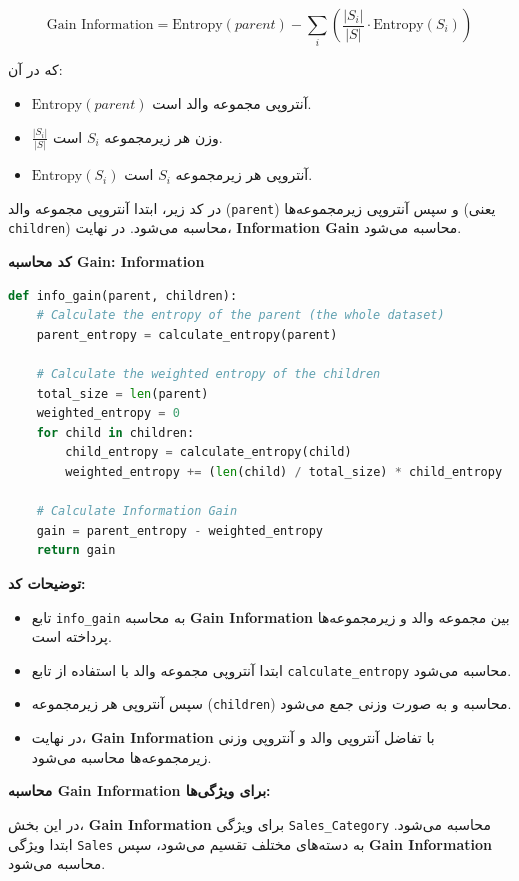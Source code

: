 \documentclass{article}
\begin{document}
\[
\text{Gain Information} = \text{Entropy}(parent) - \sum_{i} \left( \frac{|S_i|}{|S|} \cdot \text{Entropy}(S_i) \right)
\]

که در آن:
\begin{itemize}
    \item \( \text{Entropy}(parent) \) آنتروپی مجموعه والد است.
    \item \( \frac{|S_i|}{|S|} \) وزن هر زیرمجموعه \( S_i \) است.
    \item \( \text{Entropy}(S_i) \) آنتروپی هر زیرمجموعه \( S_i \) است.
\end{itemize}

در کد زیر، ابتدا آنتروپی مجموعه والد (\texttt{parent}) و سپس آنتروپی زیرمجموعه‌ها (یعنی \texttt{children}) محاسبه می‌شود. در نهایت، \textbf{Information Gain} محاسبه می‌شود.

\textbf{کد محاسبه Gain: Information}

\begin{lstlisting}[language=Python]
def info_gain(parent, children):
    # Calculate the entropy of the parent (the whole dataset)
    parent_entropy = calculate_entropy(parent)

    # Calculate the weighted entropy of the children
    total_size = len(parent)
    weighted_entropy = 0
    for child in children:
        child_entropy = calculate_entropy(child)
        weighted_entropy += (len(child) / total_size) * child_entropy

    # Calculate Information Gain
    gain = parent_entropy - weighted_entropy
    return gain
\end{lstlisting}

\textbf{توضیحات کد:}

\begin{itemize}
    \item تابع \texttt{info\_gain} به محاسبه \textbf{Gain Information} بین مجموعه والد و زیرمجموعه‌ها پرداخته است.
    \item ابتدا آنتروپی مجموعه والد با استفاده از تابع \texttt{calculate\_entropy} محاسبه می‌شود.
    \item سپس آنتروپی هر زیرمجموعه (\texttt{children}) محاسبه و به صورت وزنی جمع می‌شود.
    \item در نهایت، \textbf{Gain Information} با تفاضل آنتروپی والد و آنتروپی وزنی زیرمجموعه‌ها محاسبه می‌شود.
\end{itemize}

\textbf{محاسبه Gain Information برای ویژگی‌ها:}

در این بخش، \textbf{Gain Information} برای ویژگی \texttt{Sales\_Category} محاسبه می‌شود. ابتدا ویژگی \texttt{Sales} به دسته‌های مختلف تقسیم می‌شود، سپس \textbf{Gain Information} محاسبه می‌شود.
\end{document}
